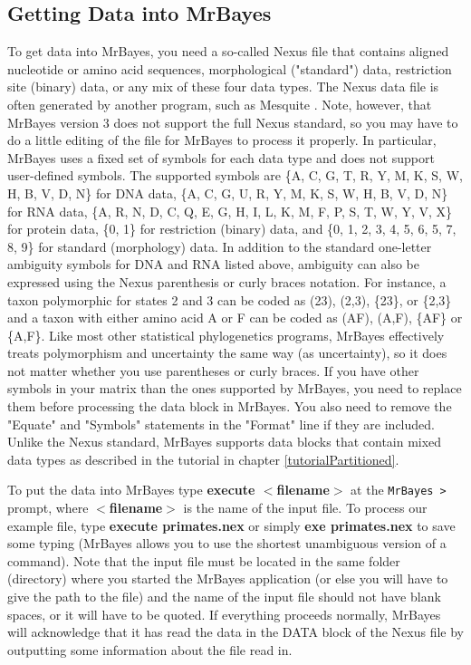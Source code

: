\documentclass[12pt]{book}
\begin{document}
\subsection{Getting Data into MrBayes}
To get data into MrBayes, you need a so-called Nexus file that contains aligned nucleotide or amino acid 
sequences, morphological ("standard") data, restriction site (binary) data, or any mix of these four data
 types. The Nexus data file is often generated by another program, such as Mesquite \citep{Maddison06}.
 Note, however, that
 MrBayes version 3 does not support the full Nexus standard, so you may have to do a little editing of the
 file for MrBayes to process it properly. In particular, MrBayes uses a fixed set of symbols for each data
 type and does not support user-defined symbols. The supported symbols are 
 \{A, C, G, T, R, Y, M, K, S, W, H, B, V, D, N\} for DNA data, 
 \{A, C, G, U, R, Y, M, K, S, W, H, B, V, D, N\} for RNA data, 
 \{A, R, N, D, C, Q, E, G, H, I, L, K, M, F, P, S, T, W, Y, V, X\} for protein data, \{0, 1\} for 
 restriction (binary) data, and \{0, 1, 2, 3, 4, 5, 6, 5, 7, 8, 9\} for standard (morphology) data. 
 In addition to the standard one-letter ambiguity symbols for DNA and RNA listed above, ambiguity can also
 be expressed using the Nexus parenthesis or curly braces notation. For instance, a taxon polymorphic for
 states 2 and 3 can be coded as (23), (2,3), \{23\}, or \{2,3\} and a taxon with either amino acid A or F
 can be coded as (AF), (A,F), \{AF\} or \{A,F\}. Like most other statistical phylogenetics programs, 
 MrBayes effectively treats polymorphism and uncertainty the same way (as uncertainty), so it does not 
 matter whether you use parentheses or curly braces. If you have other symbols in your matrix than the
 ones supported by MrBayes, you need to replace them before processing the data block in MrBayes. You
 also need to remove the "Equate" and "Symbols" statements in the "Format" line if they are included.
 Unlike the Nexus standard, MrBayes supports data blocks that contain mixed data types as described in 
 the tutorial in chapter \ref{tutorialPartitioned}.

To put the data into MrBayes type \textbf{execute $<$filename$>$} at the \texttt{MrBayes >} prompt, 
where \textbf{$<$filename$>$} is the name of the input file. To process our example file, type 
\textbf{execute primates.nex} or simply \textbf{exe primates.nex} to save some typing (MrBayes allows
 you to use the shortest unambiguous version of a command). Note that the input file must be located in
 the same folder (directory) where you started the MrBayes application (or else you will have to give the
 path to the file) and the name of the input file should not have blank spaces, or it will have to be 
quoted. If everything proceeds normally, MrBayes will acknowledge that it has read the data in the DATA 
block of the Nexus file by outputting some information about the file read in.
\end{document}
